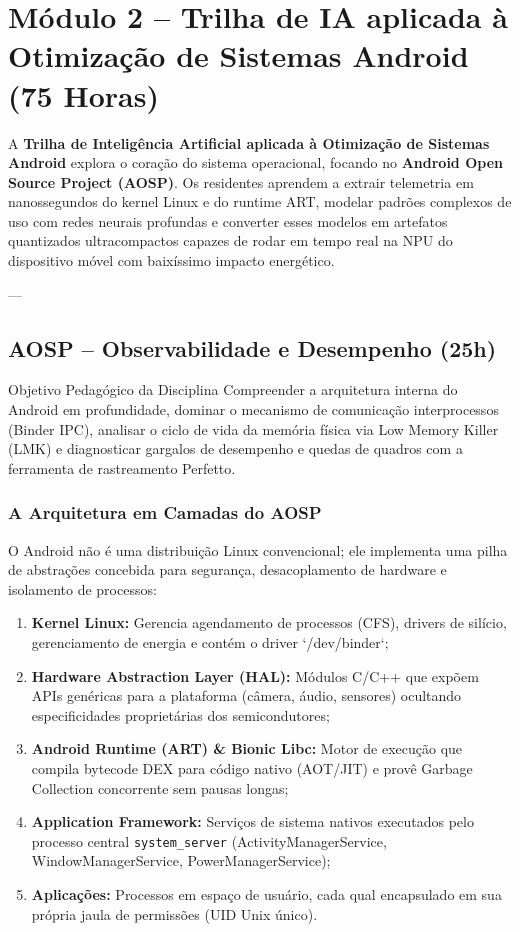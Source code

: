 \chapter{Módulo 2 – Trilha de IA aplicada à Otimização de Sistemas Android (75 Horas)}
\label{chap:modulo2}

A \textbf{Trilha de Inteligência Artificial aplicada à Otimização de Sistemas Android} explora o coração do sistema operacional, focando no \textbf{Android Open Source Project (AOSP)}. Os residentes aprendem a extrair telemetria em nanossegundos do kernel Linux e do runtime ART, modelar padrões complexos de uso com redes neurais profundas e converter esses modelos em artefatos quantizados ultracompactos capazes de rodar em tempo real na NPU do dispositivo móvel com baixíssimo impacto energético.

---

\section{AOSP – Observabilidade e Desempenho (25h)}

\begin{pedagogico}{Objetivo Pedagógico da Disciplina}
Compreender a arquitetura interna do Android em profundidade, dominar o mecanismo de comunicação interprocessos (Binder IPC), analisar o ciclo de vida da memória física via Low Memory Killer (LMK) e diagnosticar gargalos de desempenho e quedas de quadros com a ferramenta de rastreamento Perfetto.
\end{pedagogico}

\subsection{A Arquitetura em Camadas do AOSP}
O Android não é uma distribuição Linux convencional; ele implementa uma pilha de abstrações concebida para segurança, desacoplamento de hardware e isolamento de processos:
\begin{enumerate}
    \item \textbf{Kernel Linux:} Gerencia agendamento de processos (CFS), drivers de silício, gerenciamento de energia e contém o driver `/dev/binder`;
    \item \textbf{Hardware Abstraction Layer (HAL):} Módulos C/C++ que expõem APIs genéricas para a plataforma (câmera, áudio, sensores) ocultando especificidades proprietárias dos semicondutores;
    \item \textbf{Android Runtime (ART) \& Bionic Libc:} Motor de execução que compila bytecode DEX para código nativo (AOT/JIT) e provê Garbage Collection concorrente sem pausas longas;
    \item \textbf{Application Framework:} Serviços de sistema nativos executados pelo processo central \texttt{system\_server} (ActivityManagerService, WindowManagerService, PowerManagerService);
    \item \textbf{Aplicações:} Processos em espaço de usuário, cada qual encapsulado em sua própria jaula de permissões (UID Unix único).
\end{enumerate}

